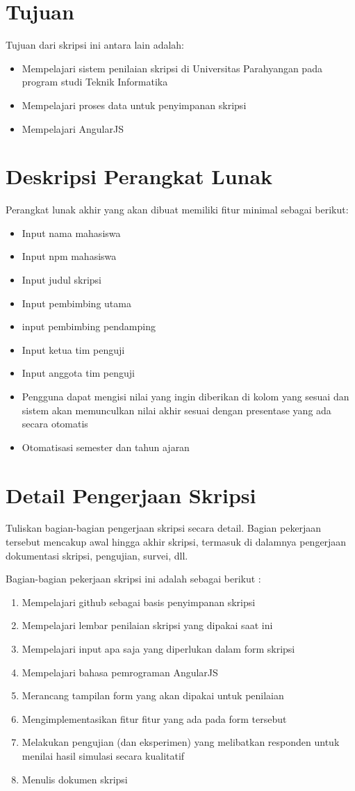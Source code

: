 \documentclass[a4paper,twoside]{article}
\begin{document}
\section{Tujuan}
Tujuan dari skripsi ini antara lain adalah:
\begin{itemize}
	\item Mempelajari sistem penilaian skripsi di Universitas Parahyangan pada program studi Teknik Informatika
	\item Mempelajari proses data untuk penyimpanan skripsi
	\item Mempelajari AngularJS
\end{itemize}

\section{Deskripsi Perangkat Lunak}
Perangkat lunak akhir yang akan dibuat memiliki fitur minimal sebagai berikut:
\begin{itemize}
	\item Input nama mahasiswa
	\item Input npm mahasiswa
	\item Input judul skripsi
	\item Input pembimbing utama
	\item input pembimbing pendamping
	\item Input ketua tim penguji
	\item Input anggota tim penguji
	\item Pengguna dapat mengisi nilai yang ingin diberikan di kolom yang sesuai dan sistem akan memunculkan nilai akhir sesuai dengan presentase yang ada secara otomatis
	\item Otomatisasi semester dan tahun ajaran
\end{itemize}

\section{Detail Pengerjaan Skripsi}
Tuliskan bagian-bagian pengerjaan skripsi secara detail. Bagian pekerjaan tersebut mencakup awal hingga akhir skripsi, termasuk di dalamnya pengerjaan dokumentasi skripsi, pengujian, survei, dll.

Bagian-bagian pekerjaan skripsi ini adalah sebagai berikut :
	\begin{enumerate}
		\item Mempelajari github sebagai basis penyimpanan skripsi
		\item Mempelajari lembar penilaian skripsi yang dipakai saat ini
		\item Mempelajari input apa saja yang diperlukan dalam form skripsi
		\item Mempelajari bahasa pemrograman AngularJS
		\item Merancang tampilan form yang akan dipakai untuk penilaian
		\item Mengimplementasikan fitur fitur yang ada pada form tersebut
		\item Melakukan pengujian (dan eksperimen) yang melibatkan responden untuk menilai hasil simulasi secara kualitatif
		\item Menulis dokumen skripsi
	\end{enumerate}
\end{document}
